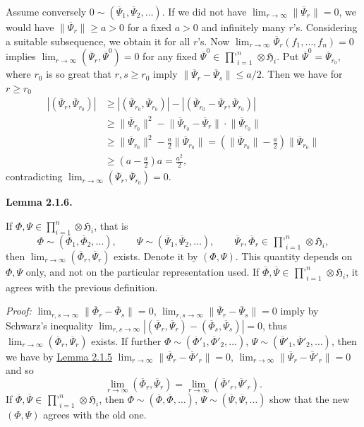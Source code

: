 \documentclass[12pt,b5paper,twoside]{article}
\newcommand{\Hspace}{\mathfrak H}
\newcommand{\Lemma}[1]{%
  \par\smallskip\noindent\phantomsection\label{lem:#1}\textbf{Lemma #1.}\enspace
}
\newcommand{\Proof}{\par\noindent\textit{Proof:}\enspace}
\newcommand{\lemref}[1]{\hyperref[lem:#1]{Lemma #1}}
\begin{document}
Assume conversely $0\sim(\overline{\Psi}_1,\overline{\Psi}_2,\ldots)$.
If we did not have
$\lim_{r\to\infty}\lVert\overline{\Psi}_r\rVert=0$, we would have
$\lVert\overline{\Psi}_r\rVert\geq a>0$ for a fixed $a>0$ and infinitely
many $r$'s.
Considering a suitable subsequence, we obtain it for all $r$'s. Now
$\lim_{r\to\infty}\overline{\Psi}_r(f_1,\ldots,f_n)=0$ implies
$\lim_{r\to\infty}(\overline{\Psi}_r,\overline{\Psi}^{0})=0$ for any fixed
$\overline{\Psi}^{0}\in
\mathop{\prod\nolimits'}_{i=1}^{n}\otimes\Hspace_i$. Put
$\overline{\Psi}^{0}=\overline{\Psi}_{r_0}$, where $r_0$ is so great that
$r,s\geq r_0$ imply
$\lVert\overline{\Psi}_r-\overline{\Psi}_s\rVert\leq a/2$.
Then we have for $r\geq r_0$
\begin{align*}
 |(\overline{\Psi}_r,\overline{\Psi}_{r_0})|
 &\geq |(\overline{\Psi}_{r_0},\overline{\Psi}_{r_0})|
       -|(\overline{\Psi}_{r_0}-\overline{\Psi}_r,
          \overline{\Psi}_{r_0})|\\
 &\geq\lVert\overline{\Psi}_{r_0}\rVert^2
       -\lVert\overline{\Psi}_{r_0}-\overline{\Psi}_r\rVert
        \cdot\lVert\overline{\Psi}_{r_0}\rVert\\
 &\geq\lVert\overline{\Psi}_{r_0}\rVert^2
       -\frac a2\lVert\overline{\Psi}_{r_0}\rVert
  =\left(\lVert\overline{\Psi}_{r_0}\rVert-\frac a2\right)
       \lVert\overline{\Psi}_{r_0}\rVert\\
 &\geq\left(a-\frac a2\right)a=\frac{a^2}{2},
\end{align*}
contradicting
$\lim_{r\to\infty}(\overline{\Psi}_r,\overline{\Psi}_{r_0})=0$.

\Lemma{2.1.6}
If $\Phi,\Psi\in\prod_{i=1}^{n}\otimes\Hspace_i$, that is
\[
 \Phi\sim(\overline{\Phi}_1,\overline{\Phi}_2,\ldots),\qquad
 \Psi\sim(\overline{\Psi}_1,\overline{\Psi}_2,\ldots),\qquad
 \overline{\Psi}_r,\overline{\Phi}_r\in
 \mathop{\prod\nolimits'}_{i=1}^{n}\otimes\Hspace_i,
\]
then $\lim_{r\to\infty}(\overline{\Phi}_r,\overline{\Psi}_r)$ exists.
Denote it by
$(\Phi,\Psi)$. This quantity depends on $\Phi,\Psi$ only, and not on the
particular representation used. If
$\overline{\Phi},\overline{\Psi}\in
\mathop{\prod\nolimits'}_{i=1}^{n}\otimes\Hspace_i$, it agrees
with the previous definition.

\Proof
$\lim_{r,s\to\infty}\lVert\overline{\Phi}_r-\overline{\Phi}_s\rVert=0$,
$\lim_{r,s\to\infty}\lVert\overline{\Psi}_r-\overline{\Psi}_s\rVert=0$
imply by Schwarz's
inequality
$\lim_{r,s\to\infty}|(\overline{\Phi}_r,\overline{\Psi}_r)
-(\overline{\Phi}_s,\overline{\Psi}_s)|=0$, thus
$\lim_{r\to\infty}(\overline{\Phi}_r,\overline{\Psi}_r)$ exists.
If further
$\Phi\sim(\overline{\Phi}'_1,\overline{\Phi}'_2,\ldots)$,
$\Psi\sim(\overline{\Psi}'_1,\overline{\Psi}'_2,\ldots)$, then we have by
\lemref{2.1.5}
$\lim_{r\to\infty}\lVert\overline{\Phi}_r-\overline{\Phi}'_r\rVert=0$,
$\lim_{r\to\infty}\lVert\overline{\Psi}_r-\overline{\Psi}'_r\rVert=0$
and so
\[
 \lim_{r\to\infty}(\overline{\Phi}_r,\overline{\Psi}_r)
 =\lim_{r\to\infty}(\overline{\Phi}'_r,\overline{\Psi}'_r).
\]
If
$\overline{\Phi},\overline{\Psi}\in
\mathop{\prod\nolimits'}_{i=1}^{n}\otimes\Hspace_i$, then
$\Phi\sim(\overline{\Phi},\overline{\Phi},\ldots)$,
$\Psi\sim(\overline{\Psi},\overline{\Psi},\ldots)$ show that the
new $(\Phi,\Psi)$ agrees with the old one.
\end{document}
